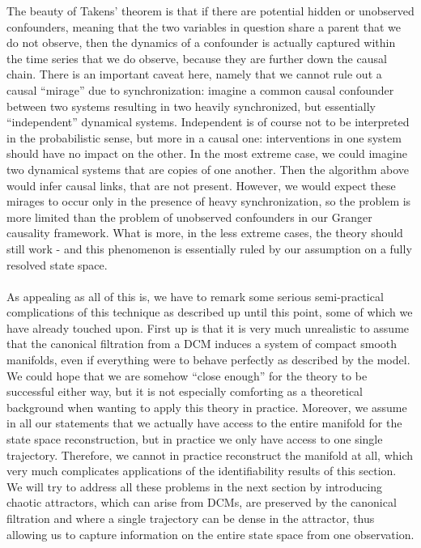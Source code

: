\documentclass[11pt, a4paper]{memoir}
\theoremstyle{break}
\theoremstyle{break}
\theoremstyle{nonumberplain}
\begin{document}
The beauty of Takens' theorem is that if there are potential hidden or unobserved confounders, meaning that the two variables in question share a parent that we do not observe, then the dynamics of a confounder is actually captured within the time series that we do observe, because they are further down the causal chain. There is an important caveat here, namely that we cannot rule out a causal \enquote{mirage} due to synchronization: imagine a common causal confounder between two systems resulting in two heavily synchronized, but essentially \enquote{independent} dynamical systems. Independent is of course not to be interpreted in the probabilistic sense, but more in a causal one: interventions in one system should have no impact on the other. In the most extreme case, we could imagine two dynamical systems that are copies of one another. Then the algorithm above would infer causal links, that are not present. However, we would expect these mirages to occur only in the presence of heavy synchronization, so the problem is more limited than the problem of unobserved confounders in our Granger causality framework. What is more, in the less extreme cases, the theory should still work - and this phenomenon is essentially ruled by our assumption on a fully resolved state space.\\\\
As appealing as all of this is, we have to remark some serious semi-practical complications of this technique as described up until this point, some of which we have already touched upon. First up is that it is very much unrealistic to assume that the canonical filtration from a DCM induces a system of compact smooth manifolds, even if everything were to behave perfectly as described by the model. We could hope that we are somehow \enquote{close enough} for the theory to be successful either way, but it is not especially comforting as a theoretical background when wanting to apply this theory in practice. Moreover, we assume in all our statements that we actually have access to the entire manifold for the state space reconstruction, but in practice we only have access to one single trajectory. Therefore, we cannot in practice reconstruct the manifold at all, which very much complicates applications of the identifiability results of this section. We will try to address all these problems in the next section by introducing chaotic attractors, which can arise from DCMs, are preserved by the canonical filtration and where a single trajectory can be dense in the attractor, thus allowing us to capture information on the entire state space from one observation.
\end{document}
